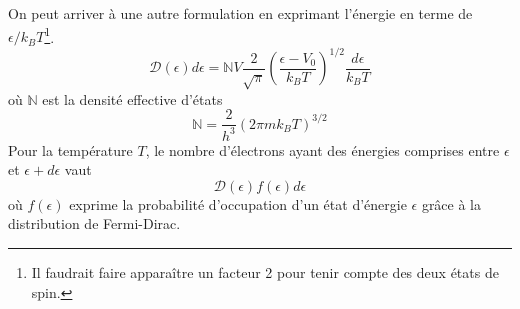 On peut arriver à une autre formulation en exprimant l'énergie en 
terme de $\epsilon/k_BT$\footnote{Il faudrait faire apparaître un 
facteur 2 pour tenir compte des deux états de spin.}. 
\begin{equation}
	\mathcal{D}(\epsilon)d\epsilon = \mathbb{N}V\frac{2}{\sqrt{\pi}}
	\left( \frac{\epsilon-V_0}{k_BT}\right)^{1/2}\frac{d\epsilon}{k_BT}
\end{equation}
où $\mathbb{N}$ est la densité effective d'états
\begin{equation}
	\mathbb{N} = \frac{2}{h^3}(2\pi m k_BT)^{3/2}
\end{equation}
Pour la température $T$, le nombre d'électrons ayant des énergies 
comprises entre $\epsilon$ et $\epsilon+d\epsilon$ vaut 
\begin{equation}
	\mathcal{D}(\epsilon)f(\epsilon)d\epsilon
\end{equation}
où $f(\epsilon)$ exprime la probabilité d'occupation d'un état 
d'énergie $\epsilon$ grâce à la distribution de Fermi-Dirac.\\

